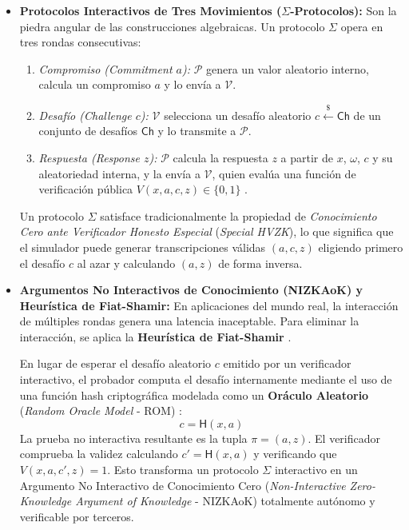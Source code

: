 \begin{itemize}
    \item \textbf{Protocolos Interactivos de Tres Movimientos ($\Sigma$-Protocolos):} Son la piedra angular de las construcciones algebraicas. Un protocolo $\Sigma$ opera en tres rondas consecutivas:
    \begin{enumerate}
        \item \textit{Compromiso (\textit{Commitment} $a$):} $\mathcal{P}$ genera un valor aleatorio interno, calcula un compromiso $a$ y lo envía a $\mathcal{V}$.
        \item \textit{Desafío (\textit{Challenge} $c$):} $\mathcal{V}$ selecciona un desafío aleatorio $c \xleftarrow{\$} \mathsf{Ch}$ de un conjunto de desafíos $\mathsf{Ch}$ y lo transmite a $\mathcal{P}$.
        \item \textit{Respuesta (\textit{Response} $z$):} $\mathcal{P}$ calcula la respuesta $z$ a partir de $x$, $\omega$, $c$ y su aleatoriedad interna, y la envía a $\mathcal{V}$, quien evalúa una función de verificación pública $V(x, a, c, z) \in \{0, 1\}$ \cite{badiezadegan2026complexity}.
    \end{enumerate}
    Un protocolo $\Sigma$ satisface tradicionalmente la propiedad de \textit{Conocimiento Cero ante Verificador Honesto Especial} (\textit{Special HVZK}), lo que significa que el simulador puede generar transcripciones válidas $(a, c, z)$ eligiendo primero el desafío $c$ al azar y calculando $(a, z)$ de forma inversa.

    \item \textbf{Argumentos No Interactivos de Conocimiento (NIZKAoK) y Heurística de Fiat-Shamir:}
    En aplicaciones del mundo real, la interacción de múltiples rondas genera una latencia inaceptable. Para eliminar la interacción, se aplica la \textbf{Heurística de Fiat-Shamir} \cite{fiat1986how}.

    En lugar de esperar el desafío aleatorio $c$ emitido por un verificador interactivo, el probador computa el desafío internamente mediante el uso de una función hash criptográfica modelada como un \textbf{Oráculo Aleatorio} (\textit{Random Oracle Model} - ROM) \cite{bellare1993random}:
    \begin{equation}
    c = \mathsf{H}(x, a)
    \end{equation}
    La prueba no interactiva resultante es la tupla $\pi = (a, z)$. El verificador comprueba la validez calculando $c' = \mathsf{H}(x, a)$ y verificando que $V(x, a, c', z) = 1$. Esto transforma un protocolo $\Sigma$ interactivo en un Argumento No Interactivo de Conocimiento Cero (\textit{Non-Interactive Zero-Knowledge Argument of Knowledge} - NIZKAoK) totalmente autónomo y verificable por terceros.


\end{itemize}
